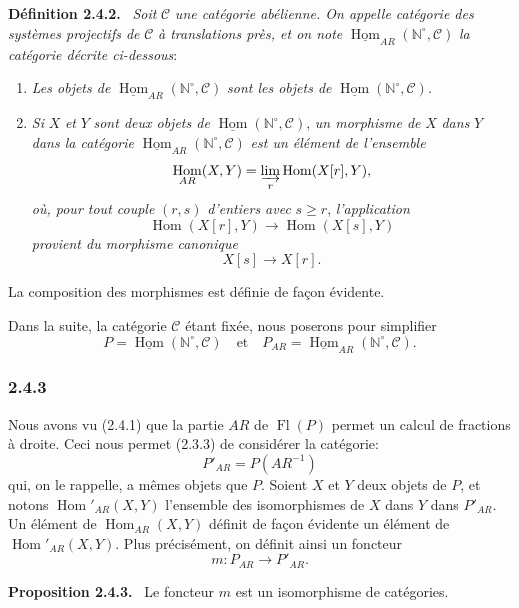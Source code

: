 \documentclass[11pt]{article}
\providecommand{\NN}{\mathbb{N}}
\newenvironment{statement}[1]{\par\medskip\noindent\textbf{#1.}\ }{\par\medskip}
\DeclareMathOperator{\Hom}{Hom}
\providecommand{\uHom}{\underline{\Hom}}
\providecommand{\Hom}{\operatorname{Hom}}
\providecommand{\Fl}{\operatorname{Fl}}
\providecommand{\NN}{\mathbb N}
\providecommand{\cC}{\mathcal C}
\providecommand{\cC}{\mathcal C}
\providecommand{\Hom}{\operatorname{Hom}}
\begin{document}
\begin{statement}{Définition 2.4.2}
\emph{Soit} $\cC$ \emph{une catégorie abélienne. On appelle catégorie des systèmes projectifs de} $\cC$ \emph{à translations près, et on note} $\uHom_{AR}(\NN^\circ,\cC)$ \emph{la catégorie décrite ci-dessous}:
\begin{enumerate}[label=(\roman*)]
\item \emph{Les objets de} $\uHom_{AR}(\NN^\circ,\cC)$ \emph{sont les objets de} $\uHom(\NN^\circ,\cC)$.
\item \emph{Si} $X$ \emph{et} $Y$ \emph{sont deux objets de} $\uHom(\NN^\circ,\cC)$, \emph{un morphisme de} $X$ \emph{dans} $Y$ \emph{dans la catégorie} $\uHom_{AR}(\NN^\circ,\cC)$ \emph{est un élément de l'ensemble}
\[
\Hom_{AR}(X,Y)=\varinjlim_r\Hom(X[r],Y),
\]
\emph{où, pour tout couple} $(r,s)$ \emph{d'entiers avec} $s\ge r$, \emph{l'application}
\[
\Hom(X[r],Y)\longrightarrow\Hom(X[s],Y)
\]
\emph{provient du morphisme canonique}
\[
X[s]\longrightarrow X[r].
\]
\end{enumerate}
La composition des morphismes est définie de façon évidente.
\end{statement}
Dans la suite, la catégorie $\cC$ étant fixée, nous poserons pour simplifier
\[
P=\uHom(\NN^\circ,\cC)\quad\text{et}\quad P_{AR}=\uHom_{AR}(\NN^\circ,\cC).
\]

\subsubsection*{2.4.3}
Nous avons vu (2.4.1) que la partie $AR$ de $\Fl(P)$ permet un calcul de fractions à droite. Ceci nous permet (2.3.3) de considérer la catégorie:
\[
P'_{AR}=P(AR^{-1})
\]
qui, on le rappelle, a mêmes objets que $P$.
Soient $X$ et $Y$ deux objets de $P$, et notons $\Hom'_{AR}(X,Y)$ l'ensemble des isomorphismes de $X$ dans $Y$ dans $P'_{AR}$. Un élément de $\Hom_{AR}(X,Y)$ définit de façon évidente un élément de $\Hom'_{AR}(X,Y)$. Plus précisément, on définit ainsi un foncteur
\[
m:P_{AR}\longrightarrow P'_{AR}.
\]

\begin{statement}{Proposition 2.4.3}
Le foncteur $m$ est un isomorphisme de catégories.
\end{statement}
\end{document}
